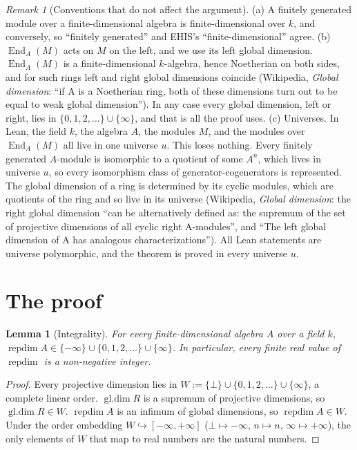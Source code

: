 \documentclass[11pt]{article}
\newtheorem{lemma}[theorem]{Lemma}
\theoremstyle{definition}
\theoremstyle{remark}
\newtheorem{remark}[theorem]{Remark}
\renewcommand{\_}{\oldus\allowbreak}
\newcommand{\repdim}{\operatorname{repdim}}
\newcommand{\gldim}{\operatorname{gl.dim}}
\newcommand{\End}{\operatorname{End}}
\begin{document}
\begin{remark}[Conventions that do not affect the argument]\label{rem:conv}
(a) A finitely generated module over a finite-dimensional algebra is finite-dimensional over $k$, and
conversely, so ``finitely generated'' and EHIS's ``finite-dimensional'' agree.
(b) $\End_A(M)$ acts on $M$ on the left, and we use its left global dimension. $\End_A(M)$ is a
finite-dimensional $k$-algebra, hence Noetherian on both sides, and for such rings left and right global
dimensions coincide (Wikipedia, \emph{Global dimension}: ``if A is a Noetherian ring, both of these
dimensions turn out to be equal to weak global dimension''). In any case every global dimension, left or
right, lies in $\{0,1,2,\dots\}\cup\{\infty\}$, and that is all the proof uses.
(c) Universes. In Lean, the field $k$, the algebra $A$, the modules $M$, and the modules over
$\End_A(M)$ all live in one universe $u$. This loses nothing. Every finitely generated $A$-module is
isomorphic to a quotient of some $A^n$, which lives in universe $u$, so every isomorphism class of
generator-cogenerators is represented. The global dimension of a ring is determined by its cyclic
modules, which are quotients of the ring and so live in its universe (Wikipedia, \emph{Global
dimension}: the right global dimension ``can be alternatively defined as: the supremum of the set of
projective dimensions of all cyclic right A-modules'', and ``The left global dimension of A has
analogous characterizations''). All Lean statements are universe polymorphic, and the theorem is proved
in every universe $u$.
\end{remark}

\section{The proof}

\begin{lemma}[Integrality]\label{lem:int}
For every finite-dimensional algebra $A$ over a field $k$, $\repdim A \in \{-\infty\}\cup\{0,1,2,\dots\}\cup\{\infty\}$.
In particular, every finite real value of $\repdim$ is a non-negative integer.
\end{lemma}

\begin{proof}
Every projective dimension lies in $W := \{\bot\}\cup\{0,1,2,\dots\}\cup\{\infty\}$, a complete linear
order. $\gldim R$ is a supremum of projective dimensions, so $\gldim R \in W$. $\repdim A$ is an
infimum of global dimensions, so $\repdim A \in W$. Under the order embedding
$W \hookrightarrow [-\infty,+\infty]$ ($\bot\mapsto-\infty$, $n\mapsto n$, $\infty\mapsto+\infty$), the only
elements of $W$ that map to real numbers are the natural numbers.
\end{proof}
\end{document}
